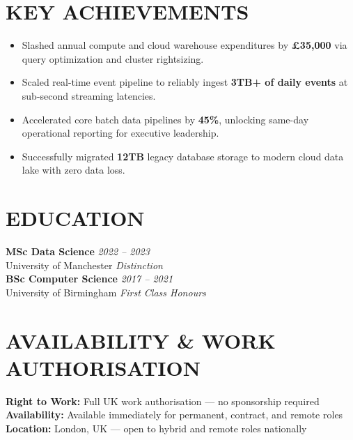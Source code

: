 \documentclass[11pt,a4paper]{article}
\begin{document}
\section*{KEY ACHIEVEMENTS}
\begin{itemize}
    \item Slashed annual compute and cloud warehouse expenditures by \textbf{\pounds35,000} via query optimization and cluster rightsizing.
    \item Scaled real-time event pipeline to reliably ingest \textbf{3TB+ of daily events} at sub-second streaming latencies.
    \item Accelerated core batch data pipelines by \textbf{45\%}, unlocking same-day operational reporting for executive leadership.
    \item Successfully migrated \textbf{12TB} legacy database storage to modern cloud data lake with zero data loss.
\end{itemize}

\section*{EDUCATION}
\textbf{MSc Data Science} \hfill \textit{2022 -- 2023} \\
University of Manchester \hfill \textit{Distinction} \\ \vspace{4pt}
\textbf{BSc Computer Science} \hfill \textit{2017 -- 2021} \\
University of Birmingham \hfill \textit{First Class Honours}

\section*{AVAILABILITY \& WORK AUTHORISATION}
\textbf{Right to Work:} Full UK work authorisation --- no sponsorship required \\
\textbf{Availability:} Available immediately for permanent, contract, and remote roles \\
\textbf{Location:} London, UK --- open to hybrid and remote roles nationally
\end{document}
